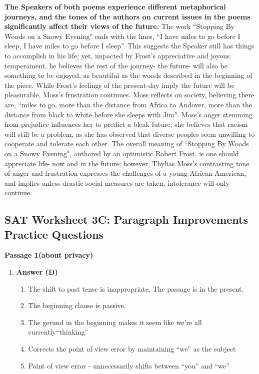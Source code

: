 \begin{enumerate}
\begin{itemize}
\begin{enumerate}
\textbf{The Speakers of both poems experience different metaphorical journeys, and the tones of the authors on current issues in the poems significantly affect their views of the future.} The work “Stopping By Woods on a Snowy Evening" ends with the lines, ``I have miles to go before I sleep, I have miles to go before I sleep”. This suggests the Speaker still has things to accomplish in his life; yet, impacted by Frost's appreciative and joyous temperament, he believes the rest of the journey- the future- will also be something to be enjoyed, as beautiful as the woods described in the beginning of the piece. While Frost's feelings of the present-day imply the future will be pleasurable, Moss's frustration continues. Moss reflects on society, believing there are, ``miles to go, more than the distance from Africa to Andover, more than the distance from black to white before she sleeps with Jim". Moss's anger stemming from prejudice influences her to predict a bleak future; she believes that racism will still be a problem, as she has observed that diverse peoples seem unwilling to cooperate and tolerate each other. The overall meaning of ``Stopping By Woods on a Snowy Evening", authored by an optimistic Robert Frost, is one should appreciate life- now and in the future; however, Thylias Moss's contrasting tone of anger and frustration expresses the challenges of a young African American, and implies unless drastic social measures are taken, intolerance will only continue.        
\end{enumerate}





\subsection{SAT Worksheet 3C: Paragraph Improvements Practice Questions}

\textbf{Passage 1(about privacy)}

\begin{enumerate}
\item \textbf{Answer (D)}

\begin{enumerate}[label=(\Alph*)]
\item The shift to past tense is inappropriate. The passage is in the present.
\item The beginning clause is passive.
\item The gerund in the beginning makes it seem like we're all currently``thinking''
\item Corrects the point of view error by maintaining ``we'' as the subject
\item Point of view error - unnecessarily shifts between ``you'' and ``we''
\end{enumerate}


\end{enumerate}
\end{itemize}
\end{enumerate}

